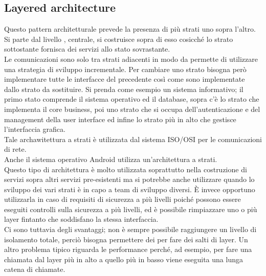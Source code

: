 \subsection{Layered architecture}
Questo pattern architetturale prevede la presenza di più strati uno sopra l'altro.\\
Si parte dal livello , centrale, si costruisce sopra di esso cosicché lo strato sottostante fornisca dei servizi allo stato sovrastante.\\
Le comunicazioni sono solo tra strati adiacenti in modo da permette di utilizzare una strategia di sviluppo incrementale.
Per cambiare uno strato bisogna però implementare tutte le interfacce del precedente così come sono implementate dallo strato da sostituire.
Si prenda come esempio un sistema informativo; il primo stato comprende il sistema operativo ed il database, sopra c'è lo strato che implementa il core business, poi uno strato che si occupa dell'autenticazione e del management della user interface ed infine lo strato più in alto che gestisce l'interfaccia grafica.\\
Tale archawitettura a strati è utilizzata dal sistema ISO/OSI per le comunicazioni di rete.\\
Anche il sistema operativo Android utilizza un'architettura a strati.\\
Questo tipo di architettura è molto utilizzata soprattutto nella costruzione di servizi sopra altri servizi pre-esistenti ma si potrebbe anche utilizzare quando lo sviluppo dei vari strati è in capo a team di sviluppo diversi.
È invece opportuno utilizzarla in caso di requisiti di sicurezza a più livelli poiché possono essere eseguiti controlli sulla sicurezza a più livelli, ed è possibile rimpiazzare uno o più layer fintanto che soddisfano la stessa interfaccia.\\
Ci sono tuttavia degli svantaggi; non è sempre possibile raggiungere un livello di isolamento totale, perciò bisogna permettere dei  per fare dei salti di layer.
Un altro problema tipico riguarda le performance perché, ad esempio, per fare una chiamata dal layer più in alto a quello più in basso viene eseguita una lunga catena di chiamate.

